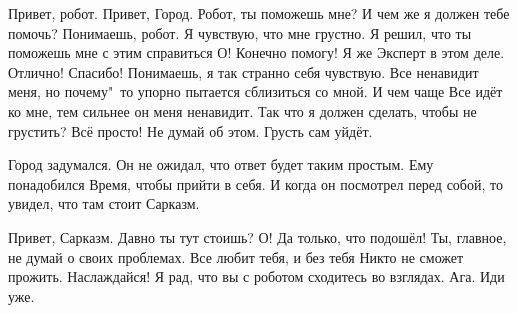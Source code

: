 {\small
\begin{dialog}
\X Привет, робот.
\R Привет, Город.
\X Робот, ты поможешь мне?
\R И чем же я должен тебе помочь?
\X Понимаешь, робот. Я чувствую, что мне грустно. Я решил, что ты поможешь мне с этим справиться
\R О! Конечно помогу! Я же Эксперт в этом деле.
\X Отлично! Спасибо! Понимаешь, я так странно себя чувствую. Все ненавидит меня, но почему"~то упорно пытается сблизиться со мной. И чем чаще Все идёт ко мне, тем сильнее он меня ненавидит. Так что я должен сделать, чтобы не грустить?
\R Всё просто! Не думай об этом. Грусть сам уйдёт.
\end{dialog}

\begin{monolog}
Город задумался. Он не ожидал, что ответ будет таким простым. Ему понадобился Время, чтобы прийти в себя. И когда он посмотрел перед собой, то увидел, что там стоит Сарказм.
\end{monolog}

\begin{dialog}
\Y Привет, Сарказм. Давно ты тут стоишь?
\X О! Да только, что подошёл! Ты, главное, не думай о своих проблемах. Все любит тебя, и без тебя Никто не сможет прожить. Наслаждайся!
\Y Я рад, что вы с роботом сходитесь во взглядах.
\X Ага. Иди уже.
\end{dialog}}